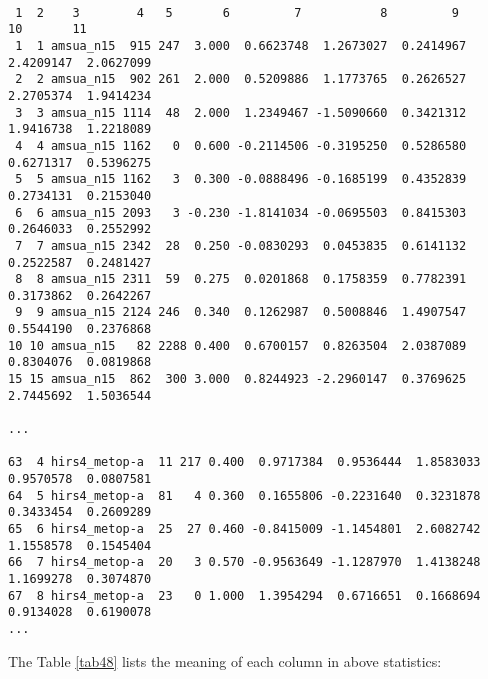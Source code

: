\begin{itemize}[leftmargin=*]
\begin{scriptsize}
\begin{verbatim}

 1  2    3        4   5       6         7           8         9        10       11
 1  1 amsua_n15  915 247  3.000  0.6623748  1.2673027  0.2414967  2.4209147  2.0627099
 2  2 amsua_n15  902 261  2.000  0.5209886  1.1773765  0.2626527  2.2705374  1.9414234
 3  3 amsua_n15 1114  48  2.000  1.2349467 -1.5090660  0.3421312  1.9416738  1.2218089
 4  4 amsua_n15 1162   0  0.600 -0.2114506 -0.3195250  0.5286580  0.6271317  0.5396275
 5  5 amsua_n15 1162   3  0.300 -0.0888496 -0.1685199  0.4352839  0.2734131  0.2153040
 6  6 amsua_n15 2093   3 -0.230 -1.8141034 -0.0695503  0.8415303  0.2646033  0.2552992
 7  7 amsua_n15 2342  28  0.250 -0.0830293  0.0453835  0.6141132  0.2522587  0.2481427
 8  8 amsua_n15 2311  59  0.275  0.0201868  0.1758359  0.7782391  0.3173862  0.2642267
 9  9 amsua_n15 2124 246  0.340  0.1262987  0.5008846  1.4907547  0.5544190  0.2376868
10 10 amsua_n15   82 2288 0.400  0.6700157  0.8263504  2.0387089  0.8304076  0.0819868
15 15 amsua_n15  862  300 3.000  0.8244923 -2.2960147  0.3769625  2.7445692  1.5036544

...

63  4 hirs4_metop-a  11 217 0.400  0.9717384  0.9536444  1.8583033  0.9570578  0.0807581
64  5 hirs4_metop-a  81   4 0.360  0.1655806 -0.2231640  0.3231878  0.3433454  0.2609289
65  6 hirs4_metop-a  25  27 0.460 -0.8415009 -1.1454801  2.6082742  1.1558578  0.1545404
66  7 hirs4_metop-a  20   3 0.570 -0.9563649 -1.1287970  1.4138248  1.1699278  0.3074870
67  8 hirs4_metop-a  23   0 1.000  1.3954294  0.6716651  0.1668694  0.9134028  0.6190078
...
\end{verbatim}
\end{scriptsize}

The Table \ref{tab48} lists the meaning of each column in above statistics:


\end{itemize}
